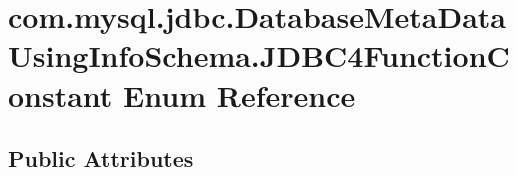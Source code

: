 \hypertarget{enumcom_1_1mysql_1_1jdbc_1_1_database_meta_data_using_info_schema_1_1_j_d_b_c4_function_constant}{}\section{com.\+mysql.\+jdbc.\+Database\+Meta\+Data\+Using\+Info\+Schema.\+J\+D\+B\+C4\+Function\+Constant Enum Reference}
\label{enumcom_1_1mysql_1_1jdbc_1_1_database_meta_data_using_info_schema_1_1_j_d_b_c4_function_constant}
\subsection*{Public Attributes}
